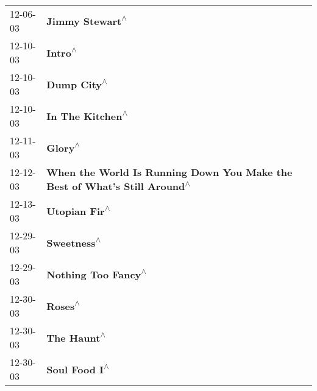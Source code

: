 \begin{supertabular}{p{0.25\columnwidth}p{0.75\columnwidth}}
 12-06-03 &                                                            \textbf{Jimmy Stewart\textsuperscript{$\wedge$}} \\
 12-10-03 &                                                                    \textbf{Intro\textsuperscript{$\wedge$}} \\
 12-10-03 &                                                                \textbf{Dump City\textsuperscript{$\wedge$}} \\
 12-10-03 &                                                           \textbf{In The Kitchen\textsuperscript{$\wedge$}} \\
 12-11-03 &                                                                    \textbf{Glory\textsuperscript{$\wedge$}} \\
 12-12-03 &  \textbf{When the World Is Running Down You Make the Best of What's Still Around\textsuperscript{$\wedge$}} \\
 12-13-03 &                                                              \textbf{Utopian Fir\textsuperscript{$\wedge$}} \\
 12-29-03 &                                                                \textbf{Sweetness\textsuperscript{$\wedge$}} \\
 12-29-03 &                                                        \textbf{Nothing Too Fancy\textsuperscript{$\wedge$}} \\
 12-30-03 &                                                                    \textbf{Roses\textsuperscript{$\wedge$}} \\
 12-30-03 &                                                                \textbf{The Haunt\textsuperscript{$\wedge$}} \\
 12-30-03 &                                                              \textbf{Soul Food I\textsuperscript{$\wedge$}} \\
\end{supertabular}
